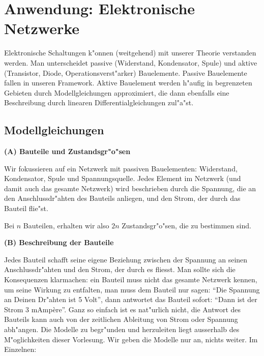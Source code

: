 



\section{Anwendung: Elektronische Netzwerke}
Elektronische Schaltungen k"onnen (weitgehend) mit unserer Theorie verstanden
werden. Man unterscheidet passive (Widerstand, Kondensator, Spule) und 
aktive (Transistor, Diode, Operationsverst"arker) Bauelemente. Passive 
Bauelemente fallen in unseren Framework. Aktive Bauelement werden h"aufig in
begrenzeten Gebieten durch Modellgleichungen approximiert, die dann ebenfalls 
eine
Beschreibung durch linearen Differentialgleichungen zul"a"st.
\subsection{Modellgleichungen}

{\bf (A) Bauteile und Zustandsgr"o"sen}
\par\medskip
Wir fokussieren auf ein Netzwerk mit passiven Bauelementen: Widerstand, Kondensator,
Spule und Spannungsquelle. Jedes Element im Netzwerk (und damit auch das gesamte 
Netzwerk) wird beschrieben durch die Spannung, die an den Anschlussdr"ahten des 
Bauteils
anliegen, und den Strom, der durch das Bauteil flie"st. \par
Bei $n$ Bauteilen, erhalten wir also $2 n$ Zustandsgr"o"sen, die zu bestimmen sind.
\par\medskip
{\bf (B)  Beschreibung der Bauteile}\par\medskip
Jedes Bauteil schafft seine eigene Beziehung zwischen der Spannung an seinen 
Anschlussdr"ahten und den
Strom, der durch es fliesst. Man sollte sich die Konsequenzen klarmachen: ein 
Bauteil muss nicht
das gesamte Netzwerk kennen, um seine Wirkung zu entfalten, man muss dem Bauteil 
nur sagen: 
``Die Spannung an Deinen Dr"ahten ist 5 Volt'',  dann antwortet das Bauteil sofort: 
``Dann ist der Strom 3 mAmp\`ere''.
Ganz so einfach ist es nat"urlich nicht, die Antwort des Bauteils kann auch von 
der zeitlichen Ableitung von
Strom oder Spannung abh"angen. Die Modelle zu begr"unden und herzuleiten liegt 
ausserhalb des M"oglichkeiten dieser
Vorlesung. Wir geben die Modelle nur an, nichts weiter. Im Einzelnen:



